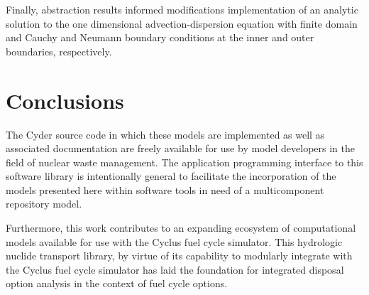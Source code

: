 \documentclass{anstrans}
\begin{document}
Finally, abstraction results informed modifications implementation of an 
analytic solution to the one dimensional advection-dispersion equation with 
finite domain and Cauchy and Neumann boundary conditions at the inner and outer 
boundaries, respectively. 

\section{Conclusions}
The Cyder source code in which these models are implemented as well as 
associated documentation are freely available for use by model developers in the 
field of nuclear waste management. The application programming interface to this 
software library is intentionally general to facilitate the incorporation of the 
models presented here within software tools in need of a multicomponent repository 
model.

Furthermore, this work contributes to an expanding ecosystem of computational 
models available for use with the Cyclus fuel cycle simulator. This hydrologic 
nuclide transport library, by virtue of its capability to modularly integrate 
with the Cyclus fuel cycle simulator has laid the foundation for integrated 
disposal option analysis in the context of fuel cycle options. 



\end{document}
